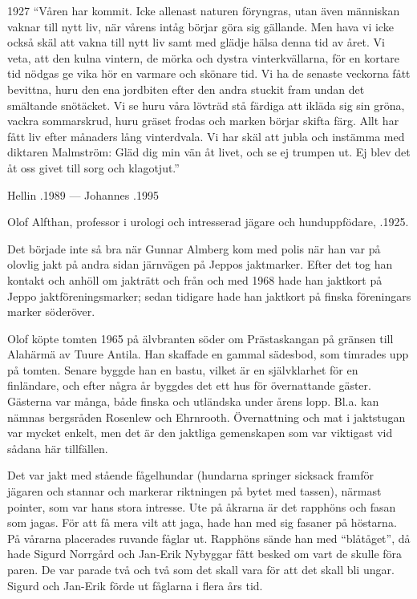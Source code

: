  1927
``Våren har kommit. Icke allenast naturen föryngras, utan även människan vaknar  till nytt liv, när vårens intåg börjar göra sig gällande. Men hava vi icke också skäl att vakna till nytt liv samt med glädje hälsa denna tid av året. Vi veta, att den kulna vintern, de mörka och dystra vinterkvällarna, för en kortare tid nödgas ge vika hör en varmare och skönare tid. Vi ha de senaste veckorna fått bevittna, huru den ena jordbiten efter den andra stuckit fram undan det smältande snötäcket. Vi se huru våra lövträd stå färdiga att ikläda sig sin gröna, vackra sommarskrud, huru gräset frodas och marken börjar skifta färg. Allt har fått liv efter månaders lång vinterdvala. Vi har skäl att jubla och instämma med diktaren Malmström: Gläd dig min vän åt livet, och se ej trumpen ut. Ej blev det åt oss givet till sorg och klagotjut.''

 Hellin .1989  ---  Johannes .1995



%



%
Olof Alfthan, professor i urologi och intresserad jägare och hunduppfödare, .1925.

Det började inte så bra när Gunnar Almberg kom med polis när han 	var på olovlig jakt på andra sidan järnvägen på Jeppos jaktmarker. Efter det tog han kontakt och anhöll om jakträtt och från och med 1968 hade han jaktkort på Jeppo jaktföreningsmarker; sedan tidigare hade han jaktkort på finska föreningars marker söderöver.

Olof köpte tomten 1965 på älvbranten söder om Prästaskangan på gränsen till Alahärmä av Tuure Antila. Han skaffade en gammal sädesbod, som timrades upp på tomten. Senare byggde han en bastu, vilket är en självklarhet för en finländare, och efter några år byggdes det ett hus för övernattande gäster. Gästerna var många, både finska och utländska under årens lopp. Bl.a. kan nämnas bergsråden Rosenlew och Ehrnrooth. Övernattning och mat i jaktstugan var mycket enkelt, men det är den jaktliga gemenskapen som var viktigast vid sådana	här tillfällen.

Det var jakt med stående fågelhundar (hundarna springer sicksack framför jägaren och stannar och markerar riktningen på bytet med tassen), närmast pointer, som var hans stora intresse. Ute på åkrarna är det rapphöns och fasan som jagas. För att få mera vilt att jaga, hade han med sig fasaner på höstarna. På vårarna placerades ruvande fåglar ut. Rapphöns sände han med ``blåtåget'', då hade Sigurd Norrgård och Jan-Erik Nybyggar fått besked om vart de skulle föra paren. De var parade två och två som det skall vara för att det skall bli ungar. Sigurd och Jan-Erik förde ut fåglarna i flera års tid.

